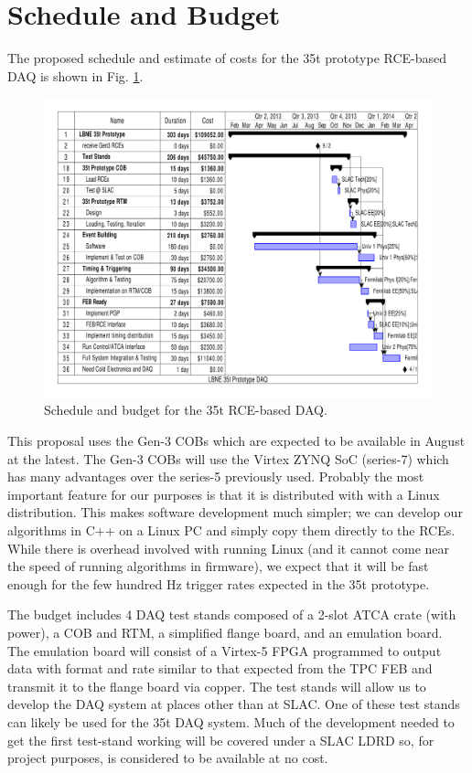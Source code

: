 \section{Schedule and Budget}

The proposed schedule and estimate of costs for the 35t prototype RCE-based DAQ is shown in Fig. \ref{fig:budget35t}.  

\begin{figure}[htb]
\includegraphics[scale=0.8,angle=90]{project-gantt.pdf}
\caption{Schedule and budget for the 35t RCE-based DAQ.}
\label{fig:budget35t}
\end{figure} 

This proposal uses the Gen-3 COBs which are expected to be available in August at the latest.  The Gen-3 COBs will use the Virtex ZYNQ SoC (series-7) which has many advantages over the series-5 previously used.  Probably the most important feature for our purposes is that it is distributed with with a Linux distribution.  This makes software development much simpler; we can develop our algorithms in C++ on a Linux PC and simply copy them directly to the RCEs.  While there is overhead involved with running Linux (and it cannot come near the speed of running algorithms in firmware), we expect that it will be fast enough for the few hundred Hz trigger rates expected in the 35t prototype.  

The budget includes 4 DAQ test stands composed of a 2-slot ATCA crate (with power), a COB and RTM, a simplified flange board, and an emulation board.  The emulation board will consist of a Virtex-5 FPGA programmed to output data with format and rate  similar to that expected from the TPC FEB and transmit it to the flange board via copper.  The test stands will allow us to develop the DAQ system at places other than at SLAC.  One of these test stands can likely be used for the 35t DAQ system.    Much of the development needed to get the first test-stand working will be covered under a SLAC LDRD so, for project purposes, is considered to be available at no cost.  

